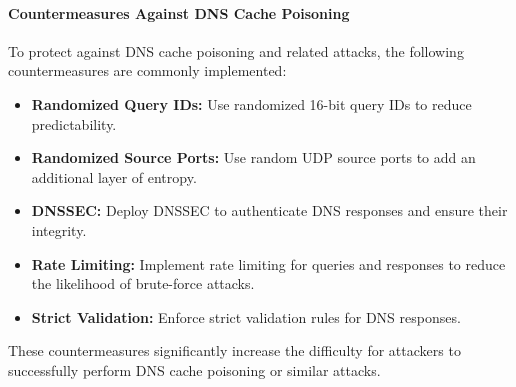 \paragraph{Countermeasures Against DNS Cache Poisoning}
To protect against DNS cache poisoning and related attacks, the following countermeasures are commonly implemented:
\begin{itemize}
    \item \textbf{Randomized Query IDs:} Use randomized 16-bit query IDs to reduce predictability.
    \item \textbf{Randomized Source Ports:} Use random UDP source ports to add an additional layer of entropy.
    \item \textbf{DNSSEC:} Deploy DNSSEC to authenticate DNS responses and ensure their integrity.
    \item \textbf{Rate Limiting:} Implement rate limiting for queries and responses to reduce the likelihood of brute-force attacks.
    \item \textbf{Strict Validation:} Enforce strict validation rules for DNS responses.
\end{itemize}

These countermeasures significantly increase the difficulty for attackers to successfully perform DNS cache poisoning or similar attacks.

